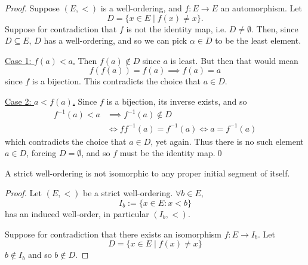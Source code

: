 \documentclass[notoc,notitlepage]{tufte-book}
\begin{document}
\begin{proof}
  Suppose $(E, <)$ is a well-ordering, and $f : E \to E$ an automorphism. Let
  \begin{equation*}
    D = \{ x \in E \mid f(x) \neq x \}.
  \end{equation*}
  Suppose for contradiction that $f$ is not the identity map, i.e. $D \neq \emptyset$. Then, since $D \subseteq E$, $D$ has a well-ordering, and so we can pick $\alpha \in D$ to be the least element.

  \noindent\underline{Case 1: $f(a) < a$.} Then $f(a) \notin D$ since $a$ is least. But then that would mean
  \begin{equation*}
    f( f(a) ) = f(a) \implies f(a) = a
  \end{equation*}
  since $f$ is a bijection. This contradicts the choice that $a \in D$.

  \noindent\underline{Case 2: $a < f(a)$.} Since $f$ is a bijection, its inverse exists, and so
  \begin{align*}
    f^{-1}(a) < a &\implies f^{-1}(a) \notin D \\
                  &\iff ff^{-1}(a) = f^{-1}(a) \iff a = f^{-1}(a)
  \end{align*}
  which contradicts the choice that $a \in D$, yet again. Thus there is no such element $a \in D$, forcing $D = \emptyset$, and so $f$ must be the identity map.\qed
\end{proof}

\begin{lemma}
\label{lemma:strict_well_ordering_notsimeq_any_of_its_proper_initial_segment}
  A strict well-ordering is not isomorphic to any proper initial segment of itself.
\end{lemma}

\begin{proof}
  Let $(E, <)$ be a strict well-ordering. $\forall b \in E$,
  \begin{equation*}
    I_b := \{ x \in E : x < b \}
  \end{equation*}
  has an induced well-order, in particular $(I_b, <)$.

  Suppose for contradiction that there exists an isomorphism $f : E \to I_b$. Let
  \begin{equation*}
    D = \{ x \in E \mid f(x) \neq x \}
  \end{equation*}
  $b \notin I_b$ and so $b \notin D$. 
\end{proof}
\end{document}
